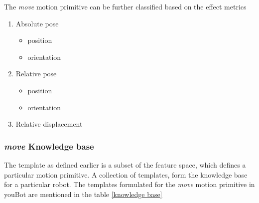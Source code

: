 The \textit{move} motion primitive can be further classified based on the effect metrics
\begin{enumerate}
    \setlength\itemsep{0.1em}
    \item Absolute pose
        \begin{itemize}
            \item position
            \item orientation
        \end{itemize}
    \item Relative pose
        \begin{itemize}
            \item position
            \item orientation
        \end{itemize}
    \item Relative displacement
\end{enumerate}




\subsubsection{\textit{move} Knowledge base}
The template as defined earlier is a subset of the feature space, which defines
a particular motion primitive. A collection of templates, form the knowledge
base for a particular robot. The templates formulated for the \textit{move} 
motion primitive in youBot are mentioned in the table \ref{knowledge base}

\newcommand{\TemplateA} {joint 1, joint 2, joint 3, joint 4, joint 5}
\newcommand{\TemplateADescription} {Joint angles of the youBot}
\newcommand{\TemplateB} {tooltip link }
\newcommand{\TemplateBDescription} { tool tip frame of youBot}
\newcommand{\TemplateC} { tooltip link, object 1}
\newcommand{\TemplateCaDescription} { Relative distance between pose of tooltip and object 1}
\newcommand{\TemplateCbDescription} { Relative distance between position of tooltip and object 1}
\newcommand{\TemplateCcDescription} { Relative distance between orientation of tooltip and object 1}
\newcommand{\TemplateD} { tooltip link, object 2}
\newcommand{\TemplateDaDescription} { Relative distance between pose of tooltip and object 2}
\newcommand{\TemplateDbDescription} { Relative distance between position of tooltip and object 2}
\newcommand{\TemplateDcDescription} { Relative distance between orientation of tooltip and object 2}

\newcommand{\TemplateE} { tooltip link, object 1, object 2}
\newcommand{\TemplateEaDescription} { Relative distance between pose of tooltip and object 1, object 2}
\newcommand{\TemplateEbDescription} { Relative distance between position of tooltip and object 1, object 2}
\newcommand{\TemplateEcDescription} { Relative distance between orientation of tooltip and object 1, object 2}

